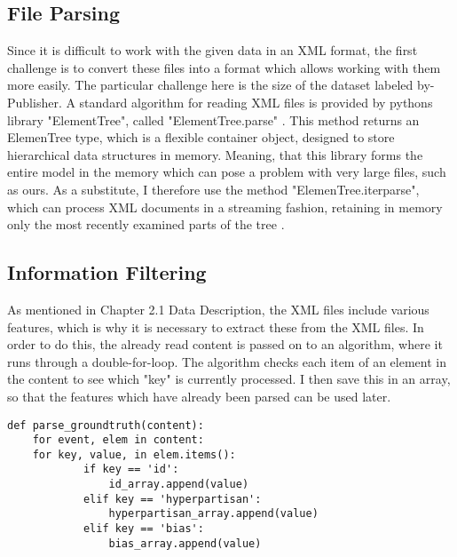 \documentclass[a4paper, 11pt,titlepage,oneside,openany]{book}
\begin{document}
\newpage
\subsection{File Parsing}
Since it is difficult to work with the given data in an XML format, the first challenge is to convert these files into a format which allows working with them more easily. The particular challenge here is the size of the dataset labeled by-Publisher. A standard algorithm for reading XML files is provided by pythons library "ElementTree", called "ElementTree.parse" \cite{parse}. This method returns an ElemenTree type, which is a flexible container object, designed to store hierarchical data structures in memory. Meaning, that this library forms the entire model in the memory which can pose a problem with very large files, such as ours. As a substitute, I therefore use the method "ElemenTree.iterparse", which can process XML documents in a streaming fashion, retaining in memory only the most recently examined parts of the tree \cite{iterparse}. 


\subsection{Information Filtering}
As mentioned in Chapter 2.1 Data Description, the XML files include various features, which is why it is necessary to extract these from the XML files. In order to do this, the already read content is passed on to an algorithm, where it runs through a double-for-loop. The algorithm checks each item of an element in the content to see which "key" is currently processed. I then save this in an array, so that the features which have already been parsed can be used later. 

\begin{lstlisting}[caption=Parse Ground-Truth File]
def parse_groundtruth(content):
    for event, elem in content:
 	for key, value, in elem.items():
            if key == 'id':
                id_array.append(value)
            elif key == 'hyperpartisan':
                hyperpartisan_array.append(value)
            elif key == 'bias':
                bias_array.append(value)
\end{lstlisting}
\newpage 
\end{document}
